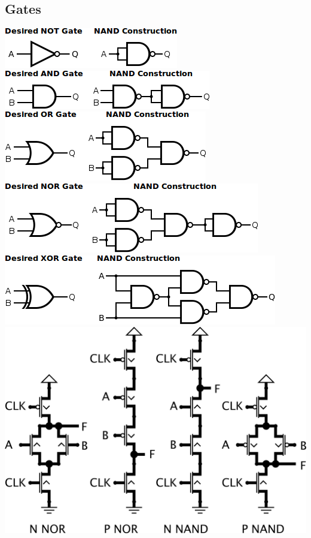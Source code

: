 \documentclass[9pt,fleqn]{article}
\begin{document}
\begin{multicols}{3}
    \subsection*{Gates}
    \includegraphics[width=\linewidth]{not.png}
    \includegraphics[width=\linewidth]{and.png}
    \includegraphics[width=\linewidth]{or.png}
    \includegraphics[width=\linewidth]{nor.png}
    \includegraphics[width=\linewidth]{xor.png}
    \includegraphics[width=\linewidth]{dynamic_gates.png}


\end{multicols}
\end{document}
